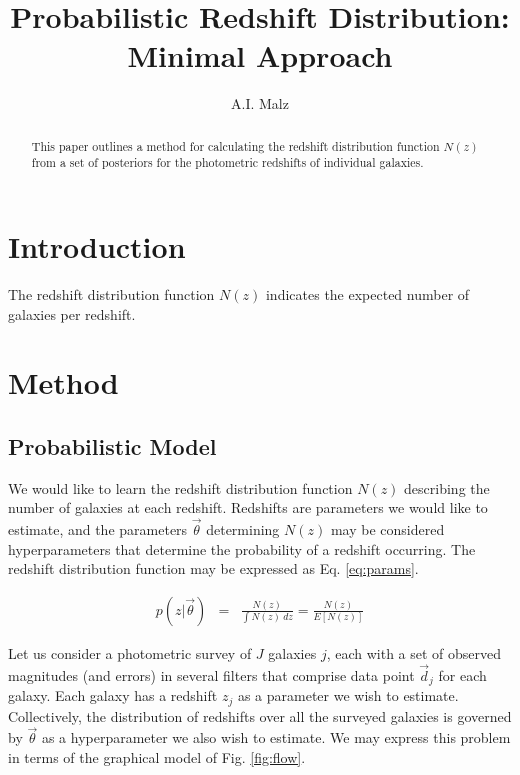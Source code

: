 \documentclass[12pt, onecolumn]{emulateapj}
\begin{document}
\title{Probabilistic Redshift Distribution: Minimal Approach}

\author{A.I. Malz}

\begin{abstract}
This paper outlines a method for calculating the redshift distribution function $N(z)$ from a set of posteriors for the photometric redshifts of individual galaxies.
\end{abstract}


\section{Introduction}

The redshift distribution function $N(z)$ indicates the expected number of galaxies per redshift.  

\section{Method}

\subsection{Probabilistic Model}

We would like to learn the redshift distribution function $N(z)$ describing the number of galaxies at each redshift.  Redshifts are parameters we would like to estimate, and the parameters $\vec{\theta}$ determining $N(z)$ may be considered hyperparameters that determine the probability of a redshift occurring.  The redshift distribution function may be expressed as Eq. \ref{eq:params}.

\begin{eqnarray}
\label{eq:params}
p(z|\vec{\theta}) &=& \frac{N(z)}{\int N(z)\ dz} = \frac{N(z)}{E[N(z)]}
\end{eqnarray}

Let us consider a photometric survey of $J$ galaxies $j$, each with a set of observed magnitudes (and errors) in several filters that comprise data point $\vec{d}_{j}$ for each galaxy.  Each galaxy has a redshift $z_{j}$ as a parameter we wish to estimate.  Collectively, the distribution of redshifts over all the surveyed galaxies is governed by $\vec{\theta}$ as a hyperparameter we also wish to estimate.  We may express this problem in terms of the graphical model of Fig. \ref{fig:flow}.
\end{document}
